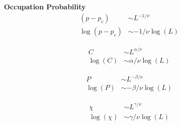 	\textbf{Occupation Probability}
	\begin{align}
		(p-p_c) &\sim L^{-1/\nu}\\
		\log(p-p_c) &\sim -1/\nu\log(L)
	\end{align}
	
		\begin{align}
	C &\sim L^{\alpha/\nu}\\
	\log(C) &\sim \alpha/\nu\log(L)
	\end{align}
	
	\begin{align}
	P &\sim L^{-\beta/\nu}\\
	\log(P) &\sim -\beta/\nu\log(L)
	\end{align}
	
	\begin{align}
	\chi &\sim L^{\gamma/\nu}\\
	\log(\chi) &\sim \gamma/\nu\log(L)
	\end{align}